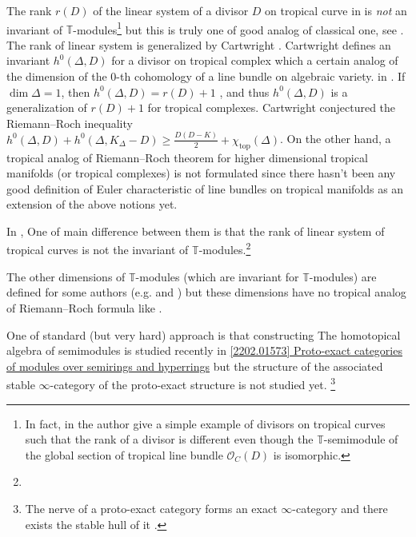 \documentclass[a4paper,dvipdfmx,reqno,12pt]{amsart}
\theoremstyle{definition}
\newcommand{\mb}[1]{\mathbb{#1}}%
\newcommand{\mcal}[1]{\mathcal{#1}}%
\newcommand{\opn}[1]{\operatorname{#1}}
\numberwithin{equation}{section}
\begin{document}
The rank $r(D)$ of the linear system of a divisor $D$ 
on tropical curve in 
\cite{gathmannRiemannRochTheoremTropical2008a}
is \emph{not} an invariant of $\mb{T}$-modules\footnote{
In fact, in \cite[Example 6.5]{yoshitomi2011generators} 
the author give a simple example of divisors on 
tropical curves such that 
the rank of a divisor is different even though 
the $\mathbb{T}$-semimodule of the global section of 
tropical line bundle $\mcal{O}_C(D)$ is isomorphic.}
but this is truly one of good analog of classical one,
see \cite[Lemma 2.4]{MR2448666}.
The rank of linear system is generalized by Cartwright
\cite{MR4131998,MR4251610}.
Cartwright defines an invariant 
$h^{0}(\Delta,D)$ for a divisor on tropical complex
which a certain analog of the dimension of
the $0$-th cohomology of a line bundle on algebraic 
variety.
in \cite[Definition 3.1]{MR4251610}.
If $\dim \Delta=1$, then $h^{0}(\Delta,D)=r(D)+1$
\cite[Proposition 3.3]{MR4251610}, and thus $h^{0}(\Delta,D)$
is a generalization of $r(D)+1$ for tropical complexes. 
Cartwright conjectured the Riemann--Roch inequality
$h^{0}(\Delta,D)+h^{0}(\Delta,K_{\Delta}-D)\geq 
\frac{D(D-K)}{2}+\chi_{\opn{top}}(\Delta)$.
On the other hand, a tropical analog of Riemann--Roch theorem
for higher dimensional tropical manifolds 
(or tropical complexes) is not formulated
since there hasn't been any good definition of 
Euler characteristic of line bundles on tropical 
manifolds as an extension of the above notions yet.

In \cite{MR3903579},
One of main difference between them is that 
the rank of linear system of tropical curves is
not the invariant of $\mb{T}$-modules.\footnote{}

The other dimensions of $\mb{T}$-modules 
(which are invariant for $\mb{T}$-modules) are defined for 
some authors (e.g. \cite[Definition 2.3]{mikhalkinTropicalCurvesTheir2008a}
and \cite[p.8]{yoshitomi2011generators}) but 
these dimensions have no tropical analog of 
Riemann--Roch formula like 
\cite{MR2355607,gathmannRiemannRochTheoremTropical2008a}.

One of standard (but very hard) approach is that 
constructing 
The homotopical algebra of semimodules is 
studied recently in 
\href{https://arxiv.org/abs/2202.01573}{[2202.01573] Proto-exact categories of modules over semirings and hyperrings}
but the structure of the associated 
stable $\infty$-category of the proto-exact structure
is not studied yet.
\footnote{The nerve of a proto-exact category
forms an exact $\infty$-category 
\cite[Example 7.2.3]{MR3970975} and there exists the
stable hull of it 
\cite{https://doi.org/10.48550/arxiv.2010.04957}.}
\end{document}
